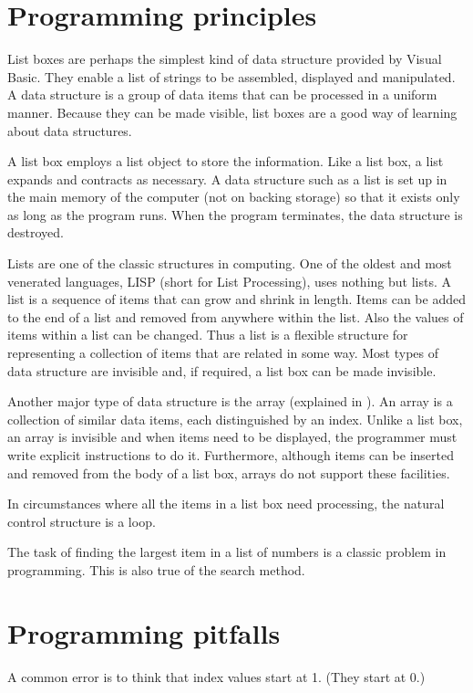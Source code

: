 	\section{Programming principles}
		List boxes are perhaps the simplest kind of data structure provided by Visual Basic. They enable a list of strings to be assembled, displayed and manipulated. A data structure is a group of data items that can be processed in a uniform manner. Because they can be made visible, list boxes are a good way of learning about data structures.

		A list box employs a list object to store the information. Like a list box, a list expands and contracts as necessary. A data structure such as a list is set up in the main memory of the computer (not on backing storage) so that it exists only as long as the program runs. When the program terminates, the data structure is destroyed.

		Lists are one of the classic structures in computing. One of the oldest and most venerated languages, LISP (short for List Processing), uses nothing but lists. A list is a sequence of items that can grow and shrink in length. Items can be added to the end of a list and removed from anywhere within the list. Also the values of items within a list can be changed. Thus a list is a ﬂexible structure for representing a collection of items that are related in some way. Most types of data structure are invisible and, if required, a list box can be made invisible.

		Another major type of data structure is the array (explained in ). An array is a collection of similar data items, each distinguished by an index. Unlike a list box, an array is invisible and when items need to be displayed, the programmer must write explicit instructions to do it. Furthermore, although items can be inserted and removed from the body of a list box, arrays do not support these facilities.
		
		In circumstances where all the items in a list box need processing, the natural control structure is a  loop.
		
		The task of finding the largest item in a list of numbers is a classic problem in programming. This is also true of the search method.


	\section{Programming pitfalls}
		A common error is to think that index values start at 1. (They start at 0.)

